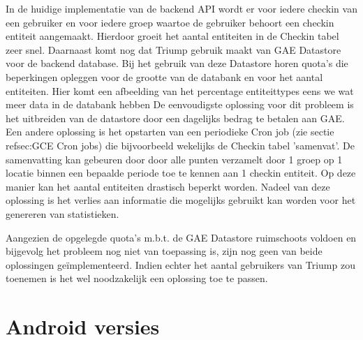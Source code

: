 In de huidige implementatie van de backend API wordt er voor iedere checkin van een gebruiker en voor iedere groep waartoe de gebruiker behoort een checkin entiteit aangemaakt. Hierdoor groeit het aantal entiteiten in de Checkin tabel zeer snel. Daarnaast komt nog dat Triump gebruik maakt van GAE Datastore voor de backend database. Bij het gebruik van deze Datastore horen quota's die beperkingen opleggen voor de grootte van de databank en voor het aantal entiteiten. 
\newline\newline
\HRule 
\newline
Hier komt een afbeelding van het percentage entiteittypes eens we wat meer data in de databank hebben \newline
\HRule
\newline\newline
De eenvoudigste oplossing voor dit probleem is het uitbreiden van de datastore door een dagelijks bedrag te betalen aan GAE. Een andere oplossing is het opstarten van een periodieke Cron job (zie sectie ref{sec:GCE} Cron jobs) die bijvoorbeeld wekelijks de Checkin tabel 'samenvat'. De samenvatting kan gebeuren door door alle punten verzamelt door 1 groep op 1 locatie binnen een bepaalde periode toe te kennen aan 1 checkin entiteit. Op deze manier kan het aantal entiteiten drastisch beperkt worden. Nadeel van deze oplossing is het verlies aan informatie die mogelijks gebruikt kan worden voor het genereren van statistieken. 

Aangezien de opgelegde quota's m.b.t. de GAE Datastore ruimschoots voldoen en bijgevolg het probleem nog niet van toepassing is, zijn nog geen van beide oplossingen geïmplementeerd.
Indien echter het aantal gebruikers van Triump zou toenemen is het wel noodzakelijk een oplossing toe te passen.

\section{Android versies}

